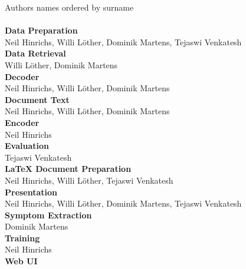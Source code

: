 
Authors names ordered by surname\\
\\
\textbf{Data Preparation}\\
Neil Hinrichs, Willi Löther, Dominik Martens, Tejaswi Venkatesh
\\
\textbf{Data Retrieval}\\
Willi Löther, Dominik Martens
\\
\textbf{Decoder}\\
Neil Hinrichs, Willi Löther, Dominik Martens
\\
\textbf{Document Text}\\
Neil Hinrichs, Willi Löther, Dominik Martens
\\
\textbf{Encoder}\\
Neil Hinrichs
\\
\textbf{Evaluation}\\
Tejaswi Venkatesh
\\
\textbf{LaTeX Document Preparation}\\
Neil Hinrichs, Willi Löther, Tejaswi Venkatesh
\\
\textbf{Presentation}\\
Neil Hinrichs, Willi Löther, Dominik Martens, Tejaswi Venkatesh
\\
\textbf{Symptom Extraction}\\
Dominik Martens
\\
\textbf{Training}\\
Neil Hinrichs
\\
\textbf{Web UI}\\
